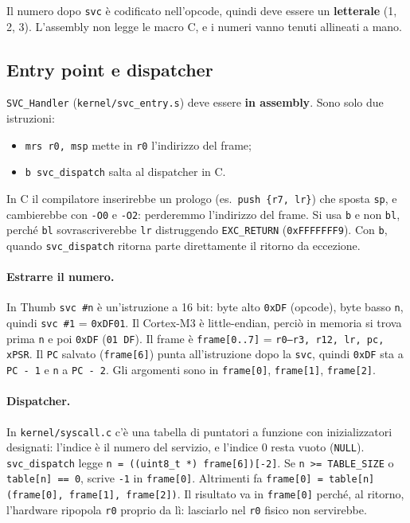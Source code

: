 Il numero dopo \texttt{svc} è codificato nell'opcode, quindi deve essere un \textbf{letterale} (1, 2, 3). L'assembly non legge le macro C, e i numeri vanno tenuti allineati a mano.
 
\subsection*{Entry point e dispatcher}
\texttt{SVC\_Handler} (\texttt{kernel/svc\_entry.s}) deve essere \textbf{in assembly}. Sono solo due istruzioni:
\begin{itemize}
    \item \texttt{mrs r0, msp} mette in \texttt{r0} l'indirizzo del frame;
    \item \texttt{b svc\_dispatch} salta al dispatcher in C.
\end{itemize}
 
In C il compilatore inserirebbe un prologo (es.\ \texttt{push \{r7, lr\}}) che sposta \texttt{sp}, e cambierebbe con \texttt{-O0} e \texttt{-O2}: perderemmo l'indirizzo del frame. Si usa \texttt{b} e non \texttt{bl}, perché \texttt{bl} sovrascriverebbe \texttt{lr} distruggendo \texttt{EXC\_RETURN} (\texttt{0xFFFFFFF9}). Con \texttt{b}, quando \texttt{svc\_dispatch} ritorna parte direttamente il ritorno da eccezione.
 
\paragraph*{Estrarre il numero.} In Thumb \texttt{svc \#n} è un'istruzione a 16 bit: byte alto \texttt{0xDF} (opcode), byte basso \texttt{n}, quindi \texttt{svc \#1} = \texttt{0xDF01}. Il Cortex-M3 è little-endian, perciò in memoria si trova prima \texttt{n} e poi \texttt{0xDF} (\texttt{01 DF}). Il frame è \texttt{frame[0..7]} = \texttt{r0--r3, r12, lr, pc, xPSR}. Il \texttt{PC} salvato (\texttt{frame[6]}) punta all'istruzione dopo la \texttt{svc}, quindi \texttt{0xDF} sta a \texttt{PC - 1} e \texttt{n} a \texttt{PC - 2}. Gli argomenti sono in \texttt{frame[0]}, \texttt{frame[1]}, \texttt{frame[2]}.
 
\paragraph*{Dispatcher.} In \texttt{kernel/syscall.c} c'è una tabella di puntatori a funzione con inizializzatori designati: l'indice è il numero del servizio, e l'indice 0 resta vuoto (\texttt{NULL}). \texttt{svc\_dispatch} legge \texttt{n = ((uint8\_t *) frame[6])[-2]}. Se \texttt{n >= TABLE\_SIZE} o \texttt{table[n] == 0}, scrive \texttt{-1} in \texttt{frame[0]}. Altrimenti fa \texttt{frame[0] = table[n](frame[0], frame[1], frame[2])}. Il risultato va in \texttt{frame[0]} perché, al ritorno, l'hardware ripopola \texttt{r0} proprio da lì: lasciarlo nel \texttt{r0} fisico non servirebbe.
 
